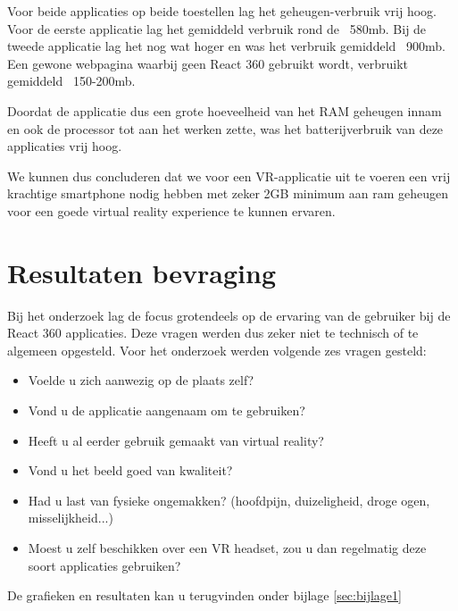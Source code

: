 Voor beide applicaties op beide toestellen lag het geheugen-verbruik vrij hoog. Voor de eerste applicatie lag het gemiddeld verbruik rond de ~580mb. Bij de tweede applicatie lag het nog wat hoger en was het verbruik gemiddeld ~900mb. Een gewone webpagina waarbij geen React 360 gebruikt wordt, verbruikt gemiddeld ~150-200mb.

Doordat de applicatie dus een grote hoeveelheid van het RAM geheugen innam en ook de processor tot aan het werken zette, was het batterijverbruik van deze applicaties vrij hoog.

We kunnen dus concluderen dat we voor een VR-applicatie uit te voeren een vrij krachtige smartphone nodig hebben met zeker 2GB minimum aan ram geheugen voor een goede virtual reality experience te kunnen ervaren.

\section{Resultaten bevraging}
\label{sec:resulaten-apps}
Bij het onderzoek lag de focus grotendeels op de ervaring van de gebruiker bij de React 360 applicaties. Deze vragen werden dus zeker niet te technisch of te algemeen opgesteld. Voor het onderzoek werden volgende zes vragen gesteld:

\begin{itemize}
	\item Voelde u zich aanwezig op de plaats zelf?
	\item Vond u de applicatie aangenaam om te gebruiken?
	\item Heeft u al eerder gebruik gemaakt van virtual reality?
	\item Vond u het beeld goed van kwaliteit?
	\item Had u last van fysieke ongemakken? (hoofdpijn, duizeligheid, droge ogen, misselijkheid...)
	\item Moest u zelf beschikken over een VR headset, zou u dan regelmatig deze soort applicaties gebruiken? 
\end{itemize}

De grafieken en resultaten kan u terugvinden onder bijlage \ref{sec:bijlage1}

